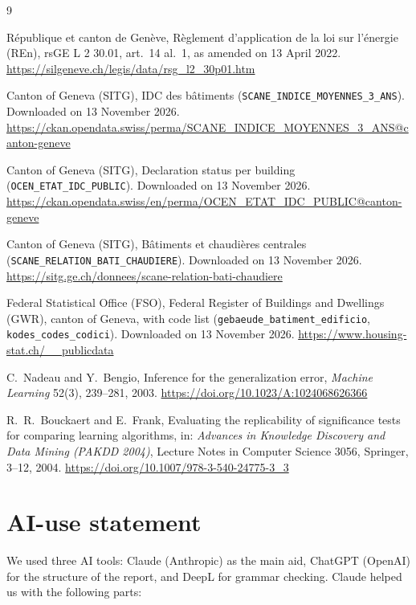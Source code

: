 \documentclass[11pt,a4paper]{article}
\begin{document}
\begin{thebibliography}{9}


 République et canton de Genève, Règlement d'application de la loi sur
l'énergie (REn), rsGE L 2 30.01, art.~14 al.~1, as amended on 13 April 2022.
\url{https://silgeneve.ch/legis/data/rsg_l2_30p01.htm}

 Canton of Geneva (SITG), IDC des bâtiments
(\texttt{SCANE\_INDICE\_MOYENNES\_3\_ANS}). Downloaded on 13 November 2026.
\url{https://ckan.opendata.swiss/perma/SCANE_INDICE_MOYENNES_3_ANS@canton-geneve}

 Canton of Geneva (SITG), Declaration status per building
(\texttt{OCEN\_ETAT\_IDC\_PUBLIC}). Downloaded on 13 November 2026.
\url{https://ckan.opendata.swiss/en/perma/OCEN_ETAT_IDC_PUBLIC@canton-geneve}

 Canton of Geneva (SITG), Bâtiments et chaudières centrales
(\texttt{SCANE\_RELATION\_BATI\_CHAUDIERE}). Downloaded on 13 November 2026.
\url{https://sitg.ge.ch/donnees/scane-relation-bati-chaudiere}

 Federal Statistical Office (FSO), Federal Register of Buildings and
Dwellings (GWR), canton of Geneva, with code list
(\texttt{gebaeude\_batiment\_edificio}, \texttt{kodes\_codes\_codici}).
Downloaded on 13 November 2026. \url{https://www.housing-stat.ch/__publicdata}

 C.~Nadeau and Y.~Bengio, Inference for the generalization error,
\emph{Machine Learning} 52(3), 239--281, 2003. \url{https://doi.org/10.1023/A:1024068626366}

 R.~R.~Bouckaert and E.~Frank, Evaluating the replicability of significance tests
for comparing learning algorithms, in: \emph{Advances in Knowledge Discovery and Data Mining (PAKDD 2004)},
Lecture Notes in Computer Science 3056, Springer, 3--12, 2004. \url{https://doi.org/10.1007/978-3-540-24775-3_3}

\end{thebibliography}

\section*{AI-use statement}

We used three AI tools: Claude (Anthropic) as the main aid, ChatGPT (OpenAI) for the structure of the report,
and DeepL for grammar checking. Claude helped us with the following parts:
\end{document}
